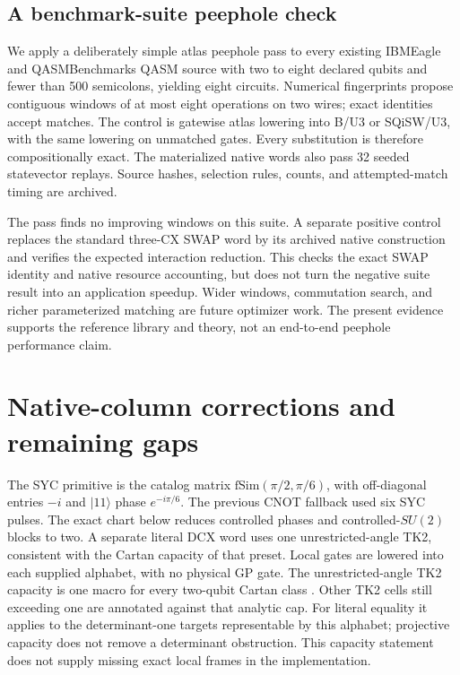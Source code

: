 \documentclass[11pt]{article}
\begin{document}
\subsection{A benchmark-suite peephole check}
We apply a deliberately simple atlas peephole pass to every existing
IBMEagle and QASMBenchmarks QASM source with two to eight declared qubits
and fewer than 500 semicolons, yielding eight circuits. Numerical
fingerprints propose contiguous windows of at most eight operations on two
wires; exact identities accept matches. The control is gatewise atlas
lowering into B/U3 or SQiSW/U3, with the same lowering on unmatched gates.
Every substitution is therefore compositionally exact. The materialized native words also pass 32 seeded statevector replays. Source hashes,
selection rules, counts, and attempted-match timing are archived.

The pass finds no improving windows on this suite. A separate positive
control replaces the standard three-CX SWAP word by its archived native
construction and verifies the expected interaction reduction. This checks the exact SWAP identity and native resource accounting, but does not turn the
negative suite result into an application speedup. Wider windows, commutation
search, and richer parameterized matching are future optimizer work. The
present evidence supports the reference library and theory, not an
end-to-end peephole performance claim.


\section{Native-column corrections and remaining gaps}\label{sec:nativegaps}
The SYC primitive is the catalog matrix $\mathrm{fSim}(\pi/2,\pi/6)$,
with off-diagonal entries $-i$ and $|11\rangle$ phase $e^{-i\pi/6}$.
The previous CNOT fallback used six SYC pulses. The exact chart below
reduces controlled phases and controlled-$SU(2)$ blocks to two. A separate
literal DCX word uses one unrestricted-angle TK2, consistent with the
Cartan capacity of that preset. Local gates are lowered into each supplied
alphabet, with no physical GP gate.
The unrestricted-angle TK2 capacity is one macro for every two-qubit
Cartan class \cite{tk2}. Other TK2 cells still exceeding one are annotated
against that analytic cap. For literal equality it applies to the
determinant-one targets representable by this alphabet; projective
capacity does not remove a determinant obstruction. This capacity statement
does not supply missing exact local frames in the implementation.
\end{document}
